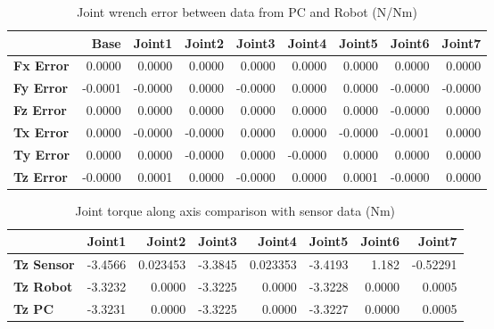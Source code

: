 \begin{table}[h!]
	\centering
	\caption{Joint wrench error between data from PC and Robot (N/Nm)}
	\label{wrech_Error_Pose13}
	\begin{tabular}{|l|r|r|r|r|r|r|r|r|}
		\hline
		\textbf{}  & \textbf{Base} & \textbf{Joint1}  & \textbf{Joint2}  & \textbf{Joint3}  & \textbf{Joint4}  & \textbf{Joint5}  & \textbf{Joint6}  & \textbf{Joint7} \\ \hline
		\textbf{Fx Error}  & 0.0000        & 0.0000        & 0.0000        & 0.0000        & 0.0000        & 0.0000        & 0.0000        & 0.0000 \\ \hline
		\textbf{Fy Error}  & -0.0001        & -0.0000        & 0.0000        & -0.0000        & 0.0000        & 0.0000        & -0.0000        & -0.0000 \\ \hline
		\textbf{Fz Error}  & 0.0000        & 0.0000        & 0.0000        & 0.0000        & 0.0000        & 0.0000        & -0.0000        & 0.0000 \\ \hline
		\textbf{Tx Error}  & 0.0000        & -0.0000        & -0.0000        & 0.0000        & 0.0000        & -0.0000        & -0.0001        & 0.0000 \\ \hline
		\textbf{Ty Error}  & 0.0000        & 0.0000        & -0.0000        & 0.0000        & -0.0000        & 0.0000        & 0.0000        & 0.0000 \\ \hline
		\textbf{Tz Error}  & -0.0000        & 0.0001        & 0.0000        & -0.0000        & 0.0000        & 0.0001        & -0.0000        & 0.0000 \\ \hline
	\end{tabular}
\end{table}

\begin{table}[h!]
	\centering
	\caption{Joint torque along axis comparison with sensor data (Nm)}
	\label{wrech_Sensor_Pose13}
	\begin{tabular}{|l|r|r|r|r|r|r|r|}
		\hline
		\textbf{} & \textbf{Joint1} & \textbf{Joint2} & \textbf{Joint3} & \textbf{Joint4} & \textbf{Joint5} & \textbf{Joint6} & \textbf{Joint7} \\ \hline
		\textbf{Tz Sensor}  & -3.4566           & 0.023453           & -3.3845            & 0.023353           & -3.4193           & 1.182           & -0.52291           \\ \hline
		\textbf{Tz Robot}  	& -3.3232           & 0.0000           & -3.3225            & 0.0000           & -3.3228           & 0.0000           & 0.0005           \\ \hline
		\textbf{Tz PC}  	& -3.3231           & 0.0000           & -3.3225            & 0.0000           & -3.3227           & 0.0000           & 0.0005           \\ \hline
	\end{tabular}
\end{table}

